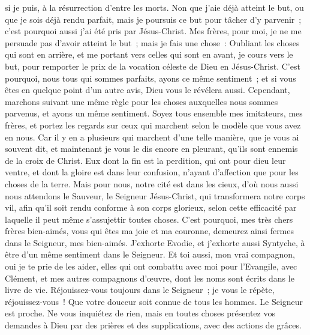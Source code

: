 \begin{multicols}{2}
si je puis, à la résurrection d'entre les morts.
Non que j'aie déjà atteint le but, ou que je sois déjà rendu parfait, mais je poursuis ce but pour tâcher d'y parvenir~; c'est pourquoi aussi j'ai été pris par Jésus-Christ.
Mes frères, pour moi, je ne me persuade pas d'avoir atteint le but~;
mais je fais une chose~: Oubliant les choses qui sont en arrière, et me portant vers celles qui sont en avant, je cours vers le but, pour remporter le prix de la vocation céleste de Dieu en Jésus-Christ.
C'est pourquoi, nous tous qui sommes parfaits, ayons ce même sentiment~; et si vous êtes en quelque point d'un autre avis, Dieu vous le révélera aussi.
Cependant, marchons suivant une même règle pour les choses auxquelles nous sommes parvenus, et ayons un même sentiment.
Soyez tous ensemble mes imitateurs, mes frères, et portez les regards sur ceux qui marchent selon le modèle que vous avez en nous.
Car il y en a plusieurs qui marchent d'une telle manière, que je vous ai souvent dit, et maintenant je vous le dis encore en pleurant, qu'ils sont ennemis de la croix de Christ. 
Eux dont la fin est la perdition, qui ont pour dieu leur ventre, et dont la gloire est dans leur confusion, n'ayant d'affection que pour les choses de la terre.
Mais pour nous, notre cité est dans les cieux, d'où nous aussi nous attendons le Sauveur, le Seigneur Jésus-Christ,
qui transformera notre corps vil, afin qu'il soit rendu conforme à son corps glorieux, selon cette efficacité par laquelle il peut même s'assujettir toutes choses. 
\VerseOne{}C'est pourquoi, mes très chers frères bien-aimés, vous qui êtes ma joie et ma couronne, demeurez ainsi fermes dans le Seigneur, mes bien-aimés.
J'exhorte Evodie, et j'exhorte aussi Syntyche, à être d'un même sentiment dans le Seigneur.
Et toi aussi, mon vrai compagnon, oui je te prie de les aider, elles qui ont combattu avec moi pour l'Evangile, avec Clément, et mes autres compagnons d'œuvre, dont les noms sont écrits dans le livre de vie.
Réjouissez-vous toujours dans le Seigneur~; je vous le répète, réjouissez-vous~!
Que votre douceur soit connue de tous les hommes. Le Seigneur est proche.
Ne vous inquiétez de rien, mais en toutes choses présentez vos demandes à Dieu par des prières et des supplications, avec des actions de grâces.

\end{multicols}
